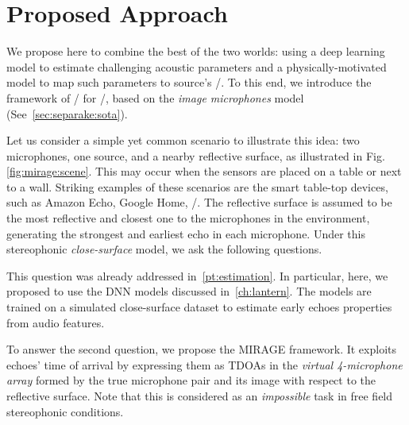 \section{Proposed Approach}
We propose here to combine the best of the two worlds:
using a deep learning model to estimate challenging acoustic parameters and a physically-motivated model to map such parameters to source's \DOAs/.
To this end, we introduce the framework of \MIRAGEdef/ for \SSL/, based on the \textit{image microphones} model~ (See~\cref{sec:separake:sota}).

\mynewline
Let us consider a simple yet common scenario to illustrate this idea:
two microphones, one source, and a nearby reflective surface, as illustrated in Fig. \cref{fig:mirage:scene}.
This may occur when the sensors are placed on a table or next to a wall.
Striking examples of these scenarios are the smart table-top devices, such as Amazon Echo, Google Home, \etc/.
The reflective surface is assumed to be the most reflective and closest one to the microphones in the environment, generating the strongest and earliest echo in each microphone.
Under this stereophonic \textit{close-surface} model, we ask the following questions.

This question was already addressed in~\cref{pt:estimation}.
In particular, here, we proposed to use the \ac{DNN} models discussed in~\cref{ch:lantern}.
The models are trained on a simulated close-surface dataset to estimate early echoes properties from audio features.

To answer the second question, we propose the \ac{MIRAGE} framework.
It exploits echoes' time of arrival by expressing them as \acp{TDOA} in the \textit{virtual 4-microphone array} formed by the true microphone pair and its image with respect to the reflective surface.
Note that this is considered as an \textit{impossible} task in free field stereophonic conditions.


